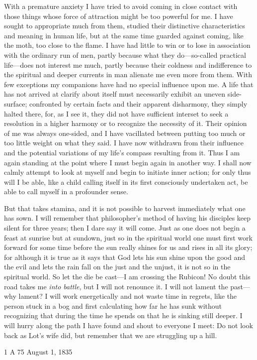  With a premature anxiety I have tried to avoid coming in close contact with those things whose force of attraction might be too powerful for me. 
 I have sought to appropriate much from them, studied their distinctive characteristics and meaning in human life, but at the same time guarded against coming, like the moth, too close to the flame. 
 I have had little to win or to lose in association with the ordinary run of men, partly because what they do---so-called practical life---does not interest me much, partly because their coldness and indifference to the spiritual and deeper currents in man alienate me even more from them. 
 With few exceptions my companions have had no special influence upon me. 
 A life that has not arrived at clarify about itself must necessarily exhibit an uneven side-surface; confronted by certain facts and their apparent disharmony, they simply halted there, for, as I see it, they did not have sufficient interset to seek a resolution in a higher harmony or to recognize the necessity of it. 
 Their opinion of me was always one-sided, and I have vacillated between putting too much or too little weight on what they said. 
 I have now withdrawn from their influence and the potential variations of my life's compass resulting from it. 
 Thus I am again standing at the point where I must begin again in another way. 
 I shall now calmly attempt to look at myself and begin to initiate inner action; for only thus will I be able, like a child calling itself  in its first consciously undertaken act, be able to call myself  in a profounder sense.


  But that takes stamina, and it is not possible to harvest immediately what one has sown. 
 I will remember that philosopher's method of having his disciples keep silent for three years; then I dare say it will come. 
 Just as one does not begin a feast at sunrise but at sundown, just so in the spiritual world one must first work forward for some time before the sun really shines for us and rises in all its glory; for although it is true as it says that God lets his sun shine upon the good and the evil and lets the rain fall on the just and the unjust, it is not so in the spiritual world. 
 So let the die be cast---I am crossing the Rubicon! 
 No doubt this road takes me \textit{into battle}, but I will not renounce it. 
 I will not lament the past---why lament? 
 I will work energetically and not waste time in regrets, like the person stuck in a bog and first calculating how far he has sunk without recognizing that during the time he spends on that he is sinking still deeper. 
 I will hurry along the path I have found and shout to everyone I meet: Do not look back as Lot's wife did, but remember that we are struggling up a hill.


  \begin{flushright} 
 1 A 75 August 1, 1835 
 \end{flushright}
